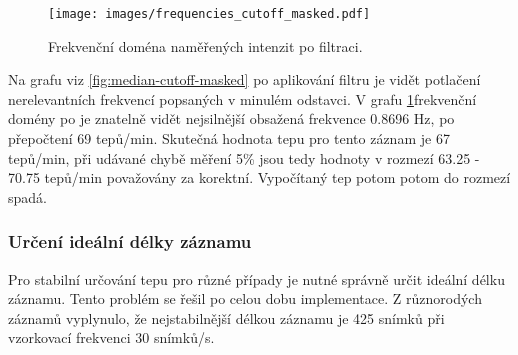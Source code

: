 \documentclass[
  digital, %
  table,   %
%
  lof,     %
  lot,     %
]{fithesis3}
\begin{document}
\begin{figure}
  \begin{center}
    \texttt{[image: images/frequencies\_cutoff\_masked.pdf]}
  \end{center}
  \caption{Frekvenční doména naměřených intenzit po filtraci.}
  \label{fig:frequencies-cutoff-masked}
\end{figure}

Na grafu viz \ref{fig:median-cutoff-masked} po aplikování filtru je vidět potlačení nerelevantních frekvencí popsaných v minulém odstavci. V grafu \ref{fig:frequencies-cutoff-masked}frekvenční domény po je znatelně vidět nejsilnější obsažená frekvence 0.8696 Hz, po přepočtení 69 tepů/min. Skutečná hodnota tepu pro tento záznam je 67 tepů/min, při udávané chybě měření 5\% jsou tedy hodnoty v rozmezí 63.25 - 70.75 tepů/min považovány za korektní. Vypočítaný tep potom potom do rozmezí spadá.

\subsubsection{Určení ideální délky záznamu}
Pro stabilní určování tepu pro různé případy je nutné správně určit ideální délku záznamu. Tento problém se řešil po celou dobu implementace. Z různorodých záznamů vyplynulo, že nejstabilnější délkou záznamu je 425 snímků při vzorkovací frekvenci 30 snímků/s.
\end{document}
